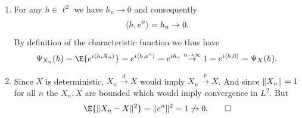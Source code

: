 \documentclass[11pt]{article}
\begin{document}
\begin{solution}
\begin{enumerate}[wide=0pt, noitemsep]
    \item[\ref{it: (counterexample levy's continuity in infinite dim) charfct}]
    For any \(h\in \ell^2\) we have \(h_n \to 0\) and consequently
    \[
        \langle h, e^n\rangle = h_n \to 0.
    \]
    By definition of the characteristic function we thus have
    \[
        \charFct_{X_n}(h)
        = \E{e^{i\scp{h, X_n}}}
        = e^{i\scp{h, e^n}}
        = e^{i h_n}
        \overset{n\to\infty}\to 1
        = e^{i\scp{h, 0}}
        = \charFct_X(h).
    \]
    \item[\ref{it: (counterexample levy's continuity in infinite dim) convergence in distribution}]
    Since \(X\) is deterministic, \(X_n \overset{d}\to X\) would imply \(X_n
    \overset{p}\to X\).
    And since \(\lVert X_n\rVert = 1\) for all \(n\) the \(X_n, X\) are bounded
    which would imply
    convergence in \(L^2\). But
    \[
        \E{\norm{X_n - X}^2}
        = \norm{e^n}^2
        = 1
        \not\to 0.
        \qedhere
    \]
\end{enumerate}    
\end{solution}




\end{document}
